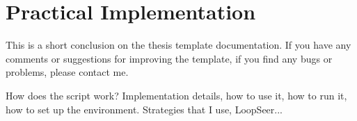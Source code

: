 \chapter{Practical Implementation}

This is a short conclusion on the thesis template documentation. If you have any comments or suggestions for improving the template, if you find any bugs or problems, please contact me. 

How does the script work? Implementation details, how to use it, how to run it, how to set up the environment. Strategies that I use, LoopSeer...

